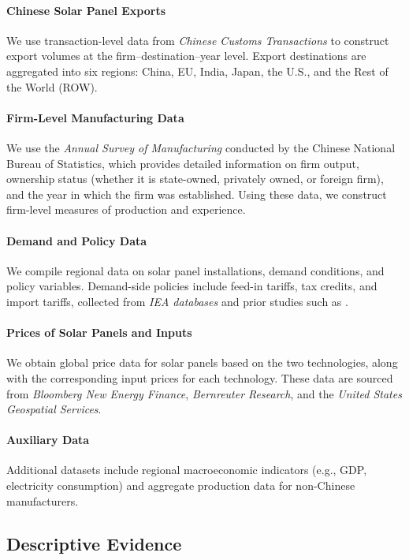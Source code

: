 \documentclass[12pt]{article}
\begin{document}
\paragraph{Chinese Solar Panel Exports}
We use transaction-level data from \textit{Chinese Customs Transactions} to construct export volumes at the firm–destination–year level. Export destinations are aggregated into six regions: China, EU, India, Japan, the U.S., and the Rest of the World (ROW).

\paragraph{Firm-Level Manufacturing Data} 
We use the \textit{Annual Survey of Manufacturing} conducted by the Chinese National Bureau of Statistics, which provides detailed information on firm output, ownership status (whether it is state-owned, privately
owned, or foreign firm), and the year in which the firm was established. Using these data, we construct firm-level measures of production and experience.

\paragraph{Demand and Policy Data} 
We compile regional data on solar panel installations, demand conditions, and policy variables. Demand-side policies include feed-in tariffs, tax credits, and import tariffs, collected from \textit{IEA databases} and prior studies such as \cite{gerarden2023demanding}.

\paragraph{Prices of Solar Panels and Inputs} 
We obtain global price data for solar panels based on the two technologies, along with the corresponding input prices for each technology. These data are sourced from \textit{Bloomberg New Energy Finance}, \textit{Bernreuter Research}, and the \textit{United States Geospatial Services}.

\paragraph{Auxiliary Data} 
Additional datasets include regional macroeconomic indicators (e.g., GDP, electricity consumption) and aggregate production data for non-Chinese manufacturers.


\subsection{Descriptive Evidence}
\label{subsec:inst_china_PV}
\end{document}
